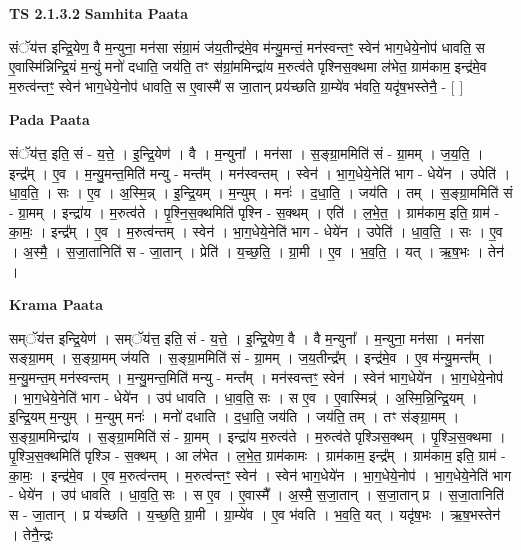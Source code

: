 \documentclass[17pt]{extarticle}
\begin{document}
\textbf{TS 2.1.3.2 } \newline
\textbf{Samhita Paata} \newline

संॅय॑त्त इन्द्रि॒येण॒ वै म॒न्युना॒ मन॑सा संग्रा॒मं ज॑य॒तीन्द्र॑मे॒व म॑न्यु॒मन्तं॒ मन॑स्वन्तꣳ॒॒ स्वेन॑ भाग॒धेये॒नोप॑ धावति॒ स ए॒वास्मि॑न्निन्द्रि॒यं म॒न्युं मनो॑ दधाति॒ जय॑ति॒ तꣳ स॑ग्रां॒ममिन्द्रा॑य म॒रुत्व॑ते पृश्निस॒क्थमा ल॑भेत॒ ग्राम॑काम॒ इन्द्र॑मे॒व म॒रुत्व॑न्तꣳ॒॒ स्वेन॑ भाग॒धेये॒नोप॑ धावति॒ स ए॒वास्मै॑ स जा॒तान् प्रय॑च्छति ग्रा॒म्ये॑व भ॑वति॒ यदृ॑ष॒भस्तेनै॒ - [  ] \newline

\textbf{Pada Paata} \newline

संॅय॑त्त॒ इति॒ सं - य॒त्ते॒ । इ॒न्द्रि॒येण॑ । वै । म॒न्युना᳚ । मन॑सा । स॒ङ्ग्रा॒ममिति॑ सं - ग्रा॒मम् । ज॒य॒ति॒ । इन्द्र᳚म् । ए॒व । म॒न्यु॒मन्त॒मिति॑ मन्यु - मन्त᳚म् । मन॑स्वन्तम् । स्वेन॑ । भा॒ग॒धेये॒नेति॑ भाग - धेये॑न । उपेति॑ । धा॒व॒ति॒ । सः । ए॒व । अ॒स्मि॒न्न् । इ॒न्द्रि॒यम् । म॒न्युम् । मनः॑ । द॒धा॒ति॒ । जय॑ति । तम् । स॒ङ्ग्रा॒ममिति॑ सं - ग्रा॒मम् । इन्द्रा॑य । म॒रुत्व॑ते । पृ॒श्नि॒स॒क्थमिति॑ पृश्नि - स॒क्थम् । एति॑ । ल॒भे॒त॒ । ग्राम॑काम॒ इति॒ ग्राम॑ - का॒मः॒ । इन्द्र᳚म् । ए॒व । म॒रुत्व॑न्तम् । स्वेन॑ । भा॒ग॒धेये॒नेति॑ भाग - धेये॑न । उपेति॑ । धा॒व॒ति॒ । सः । ए॒व । अ॒स्मै॒ । स॒जा॒तानिति॑ स - जा॒तान् । प्रेति॑ । य॒च्छ॒ति॒ । ग्रा॒मी । ए॒व । भ॒व॒ति॒ । यत् । ऋ॒ष॒भः । तेन॑ ।  \newline


\textbf{Krama Paata} \newline

सम्ॅय॑त्त इन्द्रि॒येण॑ । सम्ॅय॑त्त॒ इति॒ सं - य॒त्ते॒ । इ॒न्द्रि॒येण॒ वै । वै म॒न्युना᳚ । म॒न्युना॒ मन॑सा । मन॑सा सङ्ग्रा॒मम् । स॒ङ्ग्रा॒मम् ज॑यति । स॒ङ्ग्रा॒ममिति॑ सं - ग्रा॒मम् । ज॒य॒तीन्द्र᳚म् । इन्द्र॑मे॒व । ए॒व म॑न्यु॒मन्त᳚म् । म॒न्यु॒मन्त॒म् मन॑स्वन्तम् । म॒न्यु॒मन्त॒मिति॑ मन्यु - मन्त᳚म् । मन॑स्वन्तꣳ॒॒ स्वेन॑ । स्वेन॑ भाग॒धेये॑न । भा॒ग॒धेये॒नोप॑ । भा॒ग॒धेये॒नेति॑ भाग - धेये॑न । उप॑ धावति । धा॒व॒ति॒ सः । स ए॒व । ए॒वास्मिन्न्॑ । अ॒स्मि॒न्नि॒न्द्रि॒यम् । इ॒न्द्रि॒यम् म॒न्युम् । म॒न्युम् मनः॑ । मनो॑ दधाति । द॒धा॒ति॒ जय॑ति । जय॑ति॒ तम् । तꣳ स॑ङ्ग्रा॒मम् । स॒ङ्ग्रा॒ममिन्द्रा॑य । स॒ङ्ग्रा॒ममिति॑ सं - ग्रा॒मम् । इन्द्रा॑य म॒रुत्व॑ते । म॒रुत्व॑ते पृश्ञिस॒क्थम् । पृ॒श्ञि॒स॒क्थमा । पृ॒श्ञि॒स॒क्थमिति॑ पृश्ञि - स॒क्थम् । आ ल॑भेत । ल॒भे॒त॒ ग्राम॑कामः । ग्राम॑काम॒ इन्द्र᳚म् । ग्राम॑काम॒ इति॒ ग्राम॑ - का॒मः॒ । इन्द्र॑मे॒व । ए॒व म॒रुत्व॑न्तम् । म॒रुत्व॑न्तꣳ॒॒ स्वेन॑ । स्वेन॑ भाग॒धेये॑न । भा॒ग॒धेये॒नोप॑ । भा॒ग॒धेये॒नेति॑ भाग - धेये॑न । उप॑ धावति । धा॒व॒ति॒ सः । स ए॒व । ए॒वास्मै᳚ । अ॒स्मै॒ स॒जा॒तान् । स॒जा॒तान् प्र । स॒जा॒तानिति॑ स - जा॒तान् । प्र य॑च्छति । य॒च्छ॒ति॒ ग्रा॒मी । ग्रा॒म्ये॑व । ए॒व भ॑वति । भ॒व॒ति॒ यत् । यदृ॑ष॒भः । ऋ॒ष॒भस्तेन॑ । तेनै॒न्द्रः \newline
\end{document}
